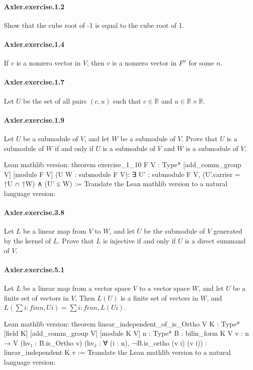 \documentclass{article}
\begin{document}
\paragraph{Axler.exercise.1.2} Show that the cube root of -1 is equal to the cube root of 1.

\paragraph{Axler.exercise.1.4} If $v$ is a nonzero vector in $V$, then $v$ is a nonzero vector in $F^n$ for some $n$.

\paragraph{Axler.exercise.1.7} Let $U$ be the set of all pairs $(c, u)$ such that $c \in ℝ$ and $u \in ℝ × ℝ$.

\paragraph{Axler.exercise.1.9} Let $U$ be a submodule of $V$, and let $W$ be a submodule of $V$. Prove that $U$ is a submodule of $W$ if and only if $U$ is a submodule of $V$ and $W$ is a submodule of $V$.

Lean mathlib version:
theorem exercise_1_10 {F V : Type*} [add_comm_group V] [module F V]
  (U W : submodule F V):
  ∃ U' : submodule F V, (U'.carrier = ↑U ∩ ↑W) ∧ (U' ≤ W) :=
Translate the Lean mathlib version to a natural language version: 

\paragraph{Axler.exercise.3.8} Let $L$ be a linear map from $V$ to $W$, and let $U$ be the submodule of $V$ generated by the kernel of $L$. Prove that $L$ is injective if and only if $U$ is a direct summand of $V$.

\paragraph{Axler.exercise.5.1} Let $L$ be a linear map from a vector space $V$ to a vector space $W$, and let $U$ be a finite set of vectors in $V$. Then $L(U)$ is a finite set of vectors in $W$, and $L(∑ i : fin n, U i) = ∑ i : fin n, L(U i)$.

Lean mathlib version:
theorem linear_independent_of_is_Ortho {V K : Type*} [field K] [add_comm_group V] [module K V] {n : Type*} {B : bilin_form K V} 
  {v : n → V} (hv₁ : B.is_Ortho v) (hv₂ : ∀ (i : n), ¬B.is_ortho (v i) (v i)) :
  linear_independent K v :=
Translate the Lean mathlib version to a natural language version: 
\end{document}
